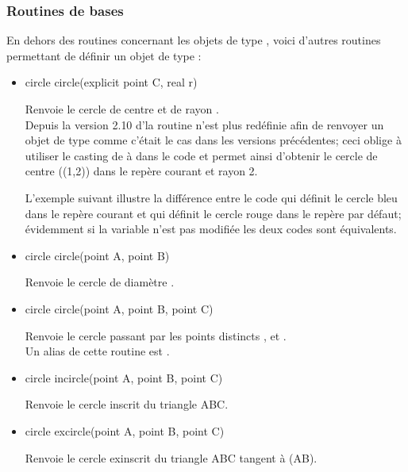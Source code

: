 \documentclass[pdftex]{article}
\begin{document}
\subsubsection{Routines de bases}
En dehors des routines concernant les objets de type , voici d'autres routines permettant de définir un
objet de type :
\begin{itemize}
\item {}%
    \begin{Vcolor}
    circle circle(explicit point C, real r)
  \end{Vcolor}
  Renvoie le cercle de centre  et de rayon .\\
  Depuis la version 2{.}10 d'\asymptote la routine
   n'est
  plus redéfinie afin de renvoyer un objet de type  comme
  c'était le cas dans les versions précédentes; ceci oblige à
  utiliser le \og{}casting\fg{} de  à  dans le code
   et permet ainsi d'obtenir le
  cercle de centre \code((1,2)) dans le repère
  courant  et rayon 2.

  L'exemple suivant illustre la différence entre le code
   qui définit le cercle bleu dans le repère courant et
   qui définit le cercle rouge dans
  le repère par défaut; évidemment si la
  variable  n'est pas modifiée les deux codes
  sont équivalents.
\item {}%
    \begin{Vcolor}
    circle circle(point A, point B)
  \end{Vcolor}
  Renvoie le cercle de diamètre .
\item {}%
    \begin{Vcolor}
    circle circle(point A, point B, point C)
  \end{Vcolor}
  Renvoie le cercle passant par les points
  distincts ,  et .\\
  Un alias de cette routine est .
\item {}%
    \begin{Vcolor}
    circle incircle(point A, point B, point C)
  \end{Vcolor}
  Renvoie le cercle inscrit du triangle ABC.
\item {}%
    \begin{Vcolor}
    circle excircle(point A, point B, point C)
  \end{Vcolor}
  Renvoie le cercle exinscrit du triangle ABC tangent à (AB).
\end{itemize}
\end{document}
